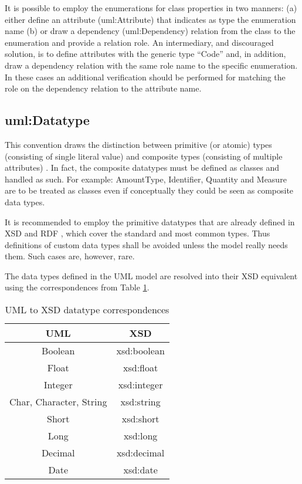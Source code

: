 	It is possible to employ the enumerations for class properties in two manners: (a) either define an attribute (uml:Attribute) that indicates as type the enumeration name (b) or draw a dependency (uml:Dependency) relation from the class to the enumeration and provide a relation role. An intermediary, and discouraged solution, is to define attributes with the generic type ``Code'' and, in addition, draw a dependency relation with the same role name to the specific enumeration. In these cases an additional verification should be performed for matching the role on the dependency relation to the attribute name.
	

	\subsection{uml:Datatype}
	\label{sec:datatype}
	
	This convention draws the distinction between primitive (or atomic) types (consisting of single literal value) and composite types (consisting of multiple attributes) \citep{isaHandbook2015}. In fact, the composite datatypes must be defined as classes and handled as such. For example: AmountType, Identifier, Quantity and Measure are to be treated as classes even if conceptually they could be seen as composite data types.
	
	It is recommended to employ the primitive datatypes that are already defined in XSD \cite{xsd1.1-spec} and RDF \cite{rdf11}, which cover the standard and most common types. Thus definitions of custom data types shall be avoided unless the model really needs them. Such cases are, however, rare.
	
	The data types defined in the UML model are resolved into their XSD equivalent using the correspondences from Table \ref{tab:uml2xsd}.
	
	\begin{table}[!ht]
		\caption{UML to XSD datatype correspondences}
		\label{tab:uml2xsd}
		\centering
		\begin{tabular}{@{}cc@{}}
			\toprule
			UML                     & XSD         \\ \midrule
			Boolean                 & xsd:boolean \\
			Float                   & xsd:float   \\
			Integer                 & xsd:integer \\
			Char, Character, String & xsd:string  \\
			Short                   & xsd:short   \\
			Long                    & xsd:long    \\
			Decimal                 & xsd:decimal \\
			Date                    & xsd:date    \\ \bottomrule
		\end{tabular}
	\end{table}

